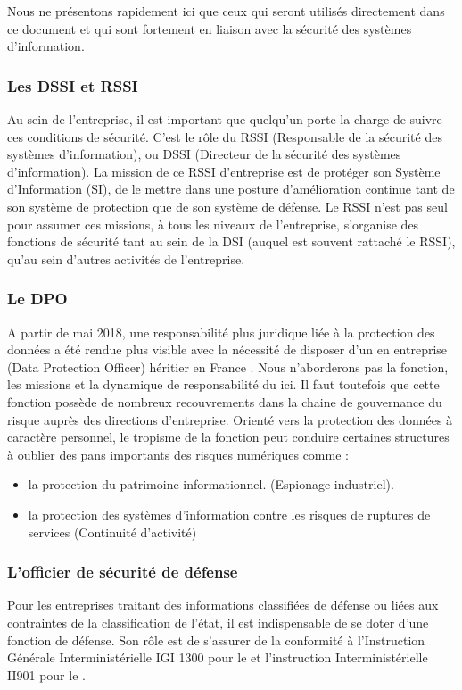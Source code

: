 Nous ne présentons rapidement ici que ceux qui seront utilisés directement dans ce document et qui sont fortement en liaison avec la sécurité des systèmes d'information.

\subsubsection{Les DSSI et RSSI}

Au sein de l'entreprise, il est important que quelqu'un porte la charge de suivre ces conditions de sécurité. C'est le rôle du RSSI (Responsable de la sécurité des systèmes d'information), ou DSSI (Directeur de la sécurité des systèmes d'information).
La mission de ce RSSI d'entreprise est de protéger son Système d'Information (SI), de le mettre dans une posture d'amélioration continue tant de son système de protection que de son système de défense. Le RSSI n'est pas seul pour assumer ces missions, à tous les niveaux de l'entreprise, s'organise des fonctions de sécurité tant au sein de la DSI (auquel est souvent rattaché le RSSI), qu'au sein d'autres activités de l'entreprise. 

\subsubsection{Le DPO}

A partir de mai 2018, une responsabilité plus juridique liée à la protection des données a été rendue plus visible avec la nécessité de disposer d'un  en entreprise (Data Protection Officer) héritier en France  \textit{}.
Nous n'aborderons pas la fonction, les missions et la dynamique de responsabilité du  ici. Il faut toutefois que cette fonction possède de nombreux recouvrements dans la chaine de gouvernance du risque  auprès des directions d'entreprise. Orienté vers la protection des données à caractère personnel, le tropisme de la fonction  peut conduire certaines structures à oublier des pans importants des risques numériques comme :

\begin{itemize}
	\item la protection du patrimoine informationnel. (Espionage industriel).
	\item la protection des systèmes d'information contre les risques de ruptures de services (Continuité d'activité)
\end{itemize}

\subsubsection{L'officier de sécurité de défense}
Pour les entreprises traitant des informations classifiées de défense ou liées aux contraintes de la classification de l'état, il est indispensable de se doter d'une fonction  de défense. Son rôle est de s'assurer de la conformité à l'Instruction Générale Interministérielle IGI 1300 pour le  et l'instruction Interministérielle II901 pour le .

